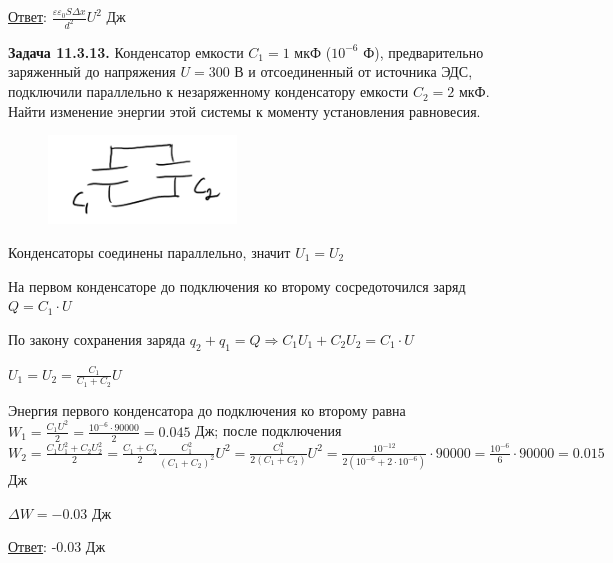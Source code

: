 \documentclass[12pt]{article}
\begin{document}
\bigvspace

\underline{Ответ}: $\frac{\varepsilon \varepsilon_0 S \Delta x}{d^2} U^2$ Дж

\begin{tcolorbox}
    \textbf{Задача 11.3.13.} Конденсатор емкости $C_1 = 1$ мкФ ($10^{-6}$ Ф), предварительно 
    заряженный до напряжения $U = 300$ В и отсоединенный от
    источника ЭДС, подключили параллельно к незаряженному конденсатору емкости $C_2 = 2$ мкФ. 
    Найти изменение энергии этой системы к моменту установления равновесия.
\end{tcolorbox}

\begin{minipage}{\textwidth}
    \begin{figure}
        \includegraphics[width=5cm]{physics1/images/physics1_homework_8_5}
    \end{figure}

    Конденсаторы соединены параллельно, значит $U_1 = U_2$

    На первом конденсаторе до подключения ко второму сосредоточился заряд $Q = C_1 \cdot U$

    По закону сохранения заряда $q_2 + q_1 = Q \Longrightarrow C_1 U_1 + C_2 U_2 = C_1 \cdot U$

    $U_1 = U_2 = \frac{C_1}{C_1 + C_2} U$

    Энергия первого конденсатора до подключения ко второму равна $W_1 = \frac{C_1 U^2}{2} = \frac{10^{-6} \cdot 90000}{2} = 0.045$ Дж; 
    после подключения $W_2 = \frac{C_1 U_1^2 + C_2 U_2^2}{2} = \frac{C_1 + C_2}{2} \frac{C^2_1}{(C_1 + C_2)^2} U^2 = 
    \frac{C^2_1}{2(C_1 + C_2)} U^2 = \frac{10^{-12}}{2 (10^{-6} + 2 \cdot 10^{-6})} \cdot 90000 = \frac{10^{-6}}{6} \cdot 90000 = 0.015$ Дж

    $\Delta W = -0.03$ Дж

\end{minipage}

\bigvspace

\underline{Ответ}: -0.03 Дж



\end{document}
